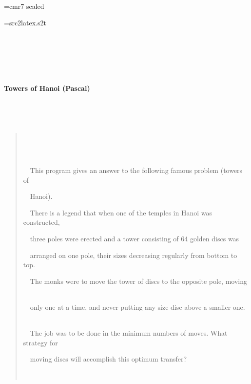 \documentclass{article}
\begin{document}
\ifx\sevenrm\undefined
  \font\sevenrm=cmr7 scaled 
\fi

\newread\MyStyle
\openin\MyStyle=src2latex.s2t
\ifeof\MyStyle
  \closein\MyStyle
\else
  
  \closein\MyStyle
\fi

\def\mc{\relax}
\def\gt{\relax}
\def\sc{\scshape}

\tt\mc 

\noindent
\rm\mc {\tt\char'173}\  \hrulefill  \rm\mc 

\noindent
\mbox{}\hfill

\noindent
\mbox{}\ \  {}%

\noindent
\mbox{}\hfill

\noindent
\mbox{}\ \  {}\centerline{\bf Towers of Hanoi (Pascal)}  \rm\mc \ 

\noindent
\mbox{}\hfill

\noindent
\mbox{}\ \  {}\begin{quote}  \rm\mc \ 

\noindent
\mbox{}\ \  {}\noindent  \rm\mc \ 

\noindent
\mbox{}\ \  {}This program gives an answer to the following famous problem (towers of  \rm\mc \ 

\noindent
\mbox{}\ \  {}Hanoi).  \rm\mc \ 

\noindent
\mbox{}\ \  {}There is a legend that when one of the temples in Hanoi was constructed,  \rm\mc \ 

\noindent
\mbox{}\ \  {}three poles were erected and a tower consisting of 64 golden discs was  \rm\mc \ 

\noindent
\mbox{}\ \  {}arranged on one pole, their sizes decreasing regularly from bottom to top.  \rm\mc \ 

\noindent
\mbox{}\ \  {}The monks were to move the tower of discs to the opposite pole, moving  \rm\mc \ 

\noindent
\mbox{}\ \  {}only one at a time, and never putting any size disc above a smaller one.  \rm\mc \ 

\noindent
\mbox{}\ \  {}The job was to be done in the minimum numbers of moves. What strategy for  \rm\mc \ 

\noindent
\mbox{}\ \  {}moving discs will accomplish this optimum transfer?  \rm\mc \ 

\noindent
\mbox{}\ \  {}\end{quote}  \rm\mc \ 

\noindent
\mbox{}\hfill

\noindent
\mbox{}\ \  {}%
\end{document}
